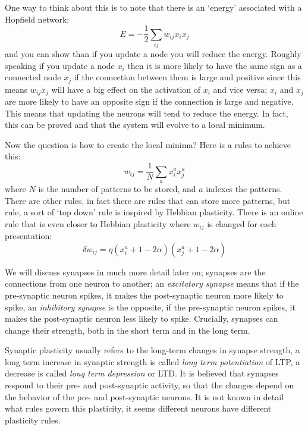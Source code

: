 \documentclass[12pt]{article}
\begin{document}
One way to think about this is to note that there is an
\lq{}energy\rq{} associated with a Hopfield network:
\begin{equation}
E=-\frac{1}{2}\sum_{ij} w_{ij}x_ix_j
\end{equation}
and you can show than if you update a node you will reduce the energy.
Roughly speaking if you update a node $x_i$ then it is more likely to
have the same sign as a connected node $x_j$ if the connection between
them is large and positive since this means $w_{ij}x_j$ will have a
big effect on the activation of $x_i$ and vice versa; $x_i$ and $x_j$
are more likely to have an opposite sign if the connection is large
and negative. This means that updating the neurons will tend to reduce
the energy. In fact, this can be proved and that the system will
evolve to a local minimum.

Now the question is how to create the local minima? Here is a rules to
achieve this:
\begin{equation}
w_{ij}=\frac{1}{N}\sum_a x^a_ix^a_j
\end{equation}
where $N$ is the number of patterns to be stored, and $a$ indexes the
patterns. There are other rules, in fact there are rules that can
store more patterns, but rule, a sort of \lq{}top down\rq{} rule is
inspired by Hebbian plasticity. There is an online rule that is even
closer to Hebbian plasticity where $w_{ij}$ is changed for each
presentation:
\begin{equation}
\delta w_{ij}=\eta (x_i^a+1-2\alpha)(x_j^a+1-2\alpha)
\end{equation}

We will discuss synapses in much more detail later on; synapses are
the connections from one neuron to another; an \textsl{excitatory
  synapse} means that if the pre-synaptic neuron spikes, it makes the
post-synaptic neuron more likely to spike, an \textsl{inhibitory
  synapse} is the opposite, if the pre-synaptic neuron spikes, it
makes the post-synaptic neuron less likely to spike. Crucially,
synapses can change their strength, both in the short term and in the
long term.

Synaptic plasticity usually refers to the long-term changes in synapse
strength, a long term increase in synaptic strength is called
\textsl{long term potentiation} of LTP, a decrease is called
\textsl{long term depression} or LTD. It is believed that synapses
respond to their pre- and post-synaptic activity, so that the changes
depend on the behavior of the pre- and post-synaptic neurons. It is
not known in detail what rules govern this plasticity, it seems
different neurons have different plasticity rules.
\end{document}
